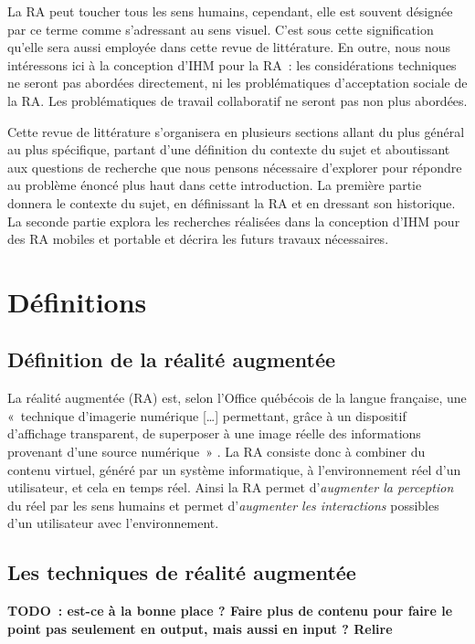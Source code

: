 
La RA peut toucher tous les sens humains, cependant, elle est souvent désignée par ce terme comme s'adressant au sens visuel. C'est sous cette signification qu'elle sera aussi employée dans cette revue de littérature. En outre, nous nous intéressons ici à la conception d'IHM pour la RA~: les considérations techniques ne seront pas abordées directement, ni les problématiques d'acceptation sociale de la RA. Les problématiques de travail collaboratif ne seront pas non plus abordées.

Cette revue de littérature s'organisera en plusieurs sections allant du plus général au plus spécifique, partant d'une définition du contexte du sujet et aboutissant aux questions de recherche que nous pensons nécessaire d'explorer pour répondre au problème énoncé plus haut dans cette introduction. La première partie donnera le contexte du sujet, en définissant la RA et en dressant son historique. La seconde partie explora les recherches réalisées dans la conception d'IHM pour des RA mobiles et portable et décrira les futurs travaux nécessaires.



\section*{Définitions}
\subsection*{Définition de la réalité augmentée}
La réalité augmentée (RA) est, selon l'Office québécois de la langue française, une «~technique d'imagerie numérique […] permettant, grâce à un dispositif d'affichage transparent, de superposer à une image réelle des informations provenant d'une source numérique~» \citep{OfficeQuebecoisLangueFrancaiseRA2015}. La RA consiste donc à combiner du contenu virtuel, généré par un système informatique, à l'environnement réel d'un utilisateur, et cela en temps réel. Ainsi la RA permet d'\emph{augmenter la perception} du réel par les sens humains et permet d'\emph{augmenter les interactions} possibles d'un utilisateur avec l'environnement. \citep{Azuma1997}


\subsection*{Les techniques de réalité augmentée}
\textbf{TODO~: est-ce à la bonne place ? Faire plus de contenu pour faire le point pas seulement en output, mais aussi en input ? Relire \cite{BimberRaskar2005}}

